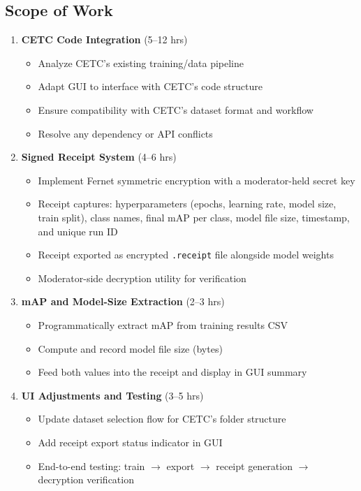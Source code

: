 \documentclass[a4paper]{article}
\begin{document}
\subsection*{Scope of Work}

\begin{enumerate}[leftmargin=*]
    \item \textbf{CETC Code Integration} (5--12 hrs)
    \begin{itemize}
        \item Analyze CETC's existing training/data pipeline
        \item Adapt GUI to interface with CETC's code structure
        \item Ensure compatibility with CETC's dataset format and workflow
        \item Resolve any dependency or API conflicts
    \end{itemize}

    \item \textbf{Signed Receipt System} (4--6 hrs)
    \begin{itemize}
        \item Implement Fernet symmetric encryption with a moderator-held secret key
        \item Receipt captures: hyperparameters (epochs, learning rate, model size, train split), class names, final mAP per class, model file size, timestamp, and unique run ID
        \item Receipt exported as encrypted \texttt{.receipt} file alongside model weights
        \item Moderator-side decryption utility for verification
    \end{itemize}

    \item \textbf{mAP and Model-Size Extraction} (2--3 hrs)
    \begin{itemize}
        \item Programmatically extract mAP from training results CSV
        \item Compute and record model file size (bytes)
        \item Feed both values into the receipt and display in GUI summary
    \end{itemize}

    \item \textbf{UI Adjustments and Testing} (3--5 hrs)
    \begin{itemize}
        \item Update dataset selection flow for CETC's folder structure
        \item Add receipt export status indicator in GUI
        \item End-to-end testing: train $\rightarrow$ export $\rightarrow$ receipt generation $\rightarrow$ decryption verification
    \end{itemize}
\end{enumerate}
\end{document}
